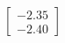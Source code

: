 \documentclass[preview]{standalone}
\begin{document}
\begin{align*}
\begin{bmatrix} -2.35 \\ -2.40 \end{bmatrix}
\end{align*}
\end{document}

